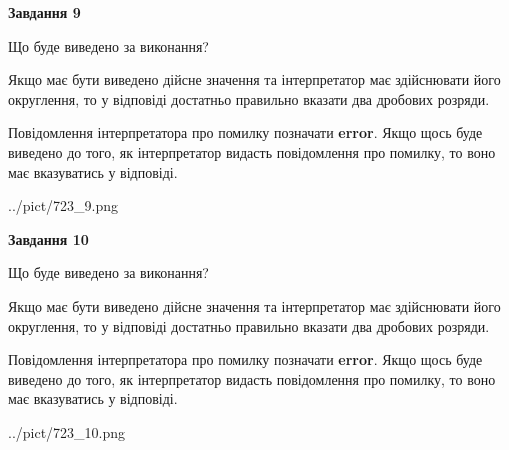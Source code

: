 \documentclass[12pt, ukrainian]{article}
\begin{document}
{\begin {Large}
{\begin {center}\textbf{Завдання 9}\end {center}}\par
Що буде виведено за виконання? \par

Якщо має бути виведено дійсне значення та інтерпретатор має здійснювати його округлення, 
то у відповіді достатньо правильно вказати два дробових розряди.

Повідомлення інтерпретатора про помилку позначати \textbf{error}.
Якщо щось буде виведено до того, як інтерпретатор видасть повідомлення про помилку, 
то воно має вказуватись у відповіді. \par

\begin{center}
	{../pict/723_9.png}
\end{center}
\newpage

{\begin {center}\textbf{Завдання 10}\end {center}}\par
Що буде виведено за виконання? \par

Якщо має бути виведено дійсне значення та інтерпретатор має здійснювати його округлення, 
то у відповіді достатньо правильно вказати два дробових розряди.

Повідомлення інтерпретатора про помилку позначати \textbf{error}.
Якщо щось буде виведено до того, як інтерпретатор видасть повідомлення про помилку, 
то воно має вказуватись у відповіді. \par

\begin{center}
	{../pict/723_10.png}
\end{center}
\newpage

\end {Large}}
\end{document}
